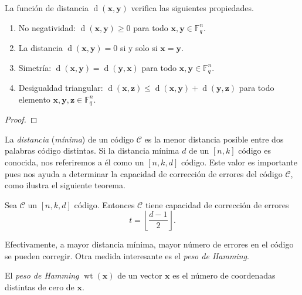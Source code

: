 \begin{theorem}
  La función de distancia \(\operatorname{d}(\symbf{x}, \symbf{y})\) verifica las siguientes propiedades.
  \begin{enumerate}
    \item No negatividad: \(\operatorname{d}(\symbf{x}, \symbf{y}) \geq 0\) para todo \(\symbf{x}, \symbf{y}\in \mathbb F_q^n\).
    \item La distancia \(\operatorname{d}(\symbf{x}, \symbf{y}) = 0\) si y solo si \(\symbf{x} = \symbf{y}\).
    \item Simetría: \(\operatorname{d}(\symbf{x}, \symbf{y}) = \operatorname{d}(\symbf{y}, \symbf{x})\) para todo \(\symbf{x}, \symbf{y}\in \mathbb F_q^n\).
    \item Desigualdad triangular: \(\operatorname{d}(\symbf{x}, \symbf{z}) \leq \operatorname{d}(\symbf{x}, \symbf{y}) + \operatorname{d}(\symbf{y}, \symbf{z})\) para todo elemento \(\symbf{x}, \symbf{y}, \symbf{z}\in \mathbb F_q^n\).
  \end{enumerate}
\end{theorem}

\begin{proof}
  
\end{proof}

La \textit{distancia} (\textit{mínima}) de un código \(\mathcal C\) es la menor distancia posible entre dos palabras código distintas. 
Si la distancia mínima \(d\) de un \([n,k]\) código es conocida, nos referiremos a él como un \([n,k,d]\) código.
Este valor es importante pues nos ayuda a determinar la capacidad de corrección de errores del código \(\mathcal C\), como ilustra el siguiente teorema.

\begin{theorem}
  Sea \(\mathcal C\) un \([n, k, d]\) código. Entonces \(\mathcal C\) tiene capacidad de corrección de errores \[
    t = \left\lfloor \frac{d - 1}{2} \right\rfloor.
  \]
\end{theorem}


Efectivamente, a mayor distancia mínima, mayor número de errores en el código se pueden corregir.
Otra medida interesante es el \textit{peso de Hamming}.

\begin{definition}
  El \textit{peso de Hamming} \(\operatorname{wt}(\symbf{x})\) de un vector \(\symbf{x}\) es el número de coordenadas distintas de cero de \(\symbf{x}\).
\end{definition}

